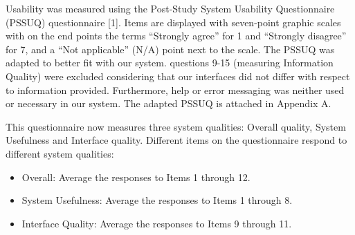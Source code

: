 Usability was measured using the Post-Study System Usability Questionnaire (PSSUQ) questionnaire [1]. Items are displayed with seven-point graphic scales with on the end points the terms “Strongly agree” for 1 and “Strongly disagree” for 7, and a “Not applicable” (N/A) point next to the scale. The PSSUQ was adapted to better fit with our system. questions 9-15 (measuring Information Quality) were excluded considering that our interfaces did not differ with respect to information provided. Furthermore, help or error messaging was neither used or necessary in our system. The adapted PSSUQ is attached in Appendix A. 

This questionnaire now measures three system qualities: Overall quality, System Usefulness and Interface quality.  Different items on the questionnaire respond to different system qualities:
\begin{itemize}
	\item Overall: Average the responses to Items 1 through 12.
	\item System Usefulness: Average the responses to Items 1 through 8.
    \item Interface Quality: Average the responses to Items 9 through 11.
\end{itemize}


